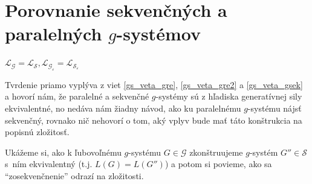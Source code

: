 \section{Porovnanie sekvenčných a paralelných $g$-systémov}
\label{gs_sec_sekvspar}

\begin{veta}
\label{gs_veta_parsek}
$\mathcal{L_G=L_S,L_{G_{\varepsilon}}=L_{S_{\varepsilon}}}$
\end{veta}

\begin{dokaz}
Tvrdenie priamo vyplýva z viet \ref{gs_veta_gre}, \ref{gs_veta_gre2} a
\ref{gs_veta_gsek} a hovorí nám, že paralelné a sekvenčné $g$-systémy
sú z hľadiska generatívnej sily ekvivalentné, no nedáva nám žiadny
návod, ako ku paralelnému $g$-systému nájsť sekvenčný, rovnako nič
nehovorí o tom, aký vplyv bude mať táto konštrukcia na popisnú
zložitosť.

Ukážeme si, ako k ľubovoľnému $g$-systému $G\in\mathcal{G}$
zkonštruujeme $g$-systém $G''\in\mathcal{S}$ \mbox{s ním}
ekvivalentný (t.j. $L(G)=L(G'')$) a potom si povieme, ako sa
``zosekvenčnenie'' odrazí na zložitosti.


\end{dokaz}
